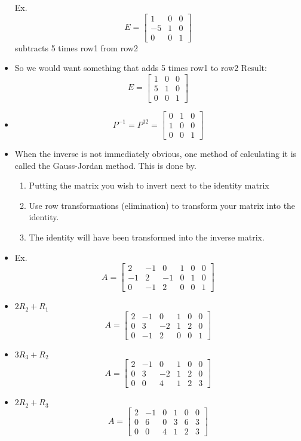 \begin{itemize}
    Ex. $$E=\begin{bmatrix}1&0&0\\-5&1&0\\0&0&1\end{bmatrix}$$ subtracts 5 times row1 from row2
    \item So we would want something that adds 5 times row1 to row2
    Result:
    $$E=\begin{bmatrix}1&0&0\\5&1&0\\0&0&1\end{bmatrix}$$
    \item $$P^{-1} = P^{12} = \begin{bmatrix}0&1&0\\1&0&0\\0&0&1\end{bmatrix}$$
    \item When the inverse is not immediately obvious, one method of calculating it is called the Gauss-Jordan method. This is done by.
    \begin{enumerate}
        \item Putting the matrix you wish to invert next to the identity matrix
        \item Use row transformations (elimination) to transform your matrix into the identity.
        \item The identity will have been transformed into the inverse matrix.
    \end{enumerate}
    \item Ex. $$A=\begin{bmatrix}2&-1&0&1&0&0\\-1&2&-1&0&1&0\\0&-1&2&0&0&1\end{bmatrix}$$
    \item $2R_2+R_1$
    $$A=\begin{bmatrix}2&-1&0&1&0&0\\0&3&-2&1&2&0\\0&-1&2&0&0&1\end{bmatrix}$$
    \item $3R_3+R_2$
    $$A=\begin{bmatrix}2&-1&0&1&0&0\\0&3&-2&1&2&0\\0&0&4&1&2&3\end{bmatrix}$$
    \item $2R_2+R_3$
    $$A=\begin{bmatrix}2&-1&0&1&0&0\\0&6&0&3&6&3\\0&0&4&1&2&3\end{bmatrix}$$

\end{itemize}

